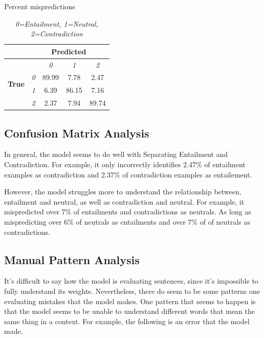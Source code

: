 \documentclass[twocolumn]{article}
\begin{document}
\begin{table}[]
\caption{Percent mispredictions}
\begin{tabular}{|l|cccc|}
\hline
                               & \multicolumn{4}{c|}{\textbf{Predicted}}                                                                          \\ \hline
\multirow{4}{*}{\textbf{True}} & \multicolumn{1}{l|}{}           & \multicolumn{1}{c|}{\textit{0}} & \multicolumn{1}{c|}{\textit{1}} & \textit{2} \\ \cline{2-5} 
                               & \multicolumn{1}{c|}{\textit{0}} & \multicolumn{1}{c|}{89.99}      & \multicolumn{1}{c|}{7.78}       & 2.47       \\ \cline{2-5} 
                               & \multicolumn{1}{c|}{\textit{1}} & \multicolumn{1}{c|}{6.39}       & \multicolumn{1}{c|}{86.15}      & 7.16       \\ \cline{2-5} 
                               & \multicolumn{1}{c|}{\textit{2}} & \multicolumn{1}{c|}{2.37}       & \multicolumn{1}{c|}{7.94}       & 89.74      \\ \hline
\end{tabular}
\caption*{\textit{ 0=Entailment, 1=Neutral, 2=Contradiction }}
\end{table}

\subsection{Confusion Matrix Analysis}
In general, the model seems to do well with Separating Entailment and
Contradiction. For example, it only incorrectly identifies 2.47\% of entailment
examples as contradiction and 2.37\% of contradiction examples as entailement.

However, the model struggles more to understand the relationship between,
entailment and neutral, as well as contradiction and neutral. For example, it
mispredicted over 7\% of entailments and contradictions as neutrals. As long as 
mispredicting over 6\% of neutrals as entailments and over 7\% of of neutrals as
contradictions.

\subsection{Manual Pattern Analysis}

It's difficult to say how the model is evaluating sentences, since it's
impossible to fully understand its weights. Nevertheless, there do seem to be
some patterns one evaluating mistakes that the model makes. One pattern that
seems to happen is that the model seems to be unable to understand different
words that mean the same thing in a context. For example, the following is an
error that the model made. 
\end{document}
